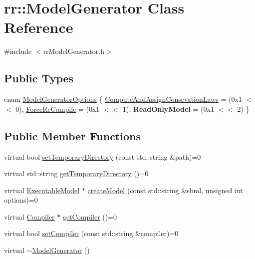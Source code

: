 \hypertarget{classrr_1_1_model_generator}{\section{rr\-:\-:Model\-Generator Class Reference}
\label{classrr_1_1_model_generator}
}


{\ttfamily \#include $<$rr\-Model\-Generator.\-h$>$}

\subsection*{Public Types}
\begin{DoxyCompactItemize}
\item 
enum \hyperlink{classrr_1_1_model_generator_a4f280529e0531ec3132c80ffda967767}{Model\-Generator\-Options} \{ \hyperlink{classrr_1_1_model_generator_a4f280529e0531ec3132c80ffda967767ae7234e27c5800a53fdafaba33a92e9d0}{Compute\-And\-Assign\-Consevation\-Laws} = (0x1 $<$$<$ 0), 
\hyperlink{classrr_1_1_model_generator_a4f280529e0531ec3132c80ffda967767a369f1d228bd06da224ce2235433af7eb}{Force\-Re\-Compile} = (0x1 $<$$<$ 1), 
{\bfseries Read\-Only\-Model} = (0x1 $<$$<$ 2)
 \}
\end{DoxyCompactItemize}
\subsection*{Public Member Functions}
\begin{DoxyCompactItemize}
\item 
virtual bool \hyperlink{classrr_1_1_model_generator_a8500374e3f19898dc3e62fbe864d785f}{set\-Temporary\-Directory} (const std\-::string \&path)=0
\item 
virtual std\-::string \hyperlink{classrr_1_1_model_generator_a89d7728fd2fa604a08e4733aeb09ce3c}{get\-Temporary\-Directory} ()=0
\item 
virtual \hyperlink{classrr_1_1_executable_model}{Executable\-Model} $\ast$ \hyperlink{classrr_1_1_model_generator_a7e30f93976e5f39ee274968690ca59b7}{create\-Model} (const std\-::string \&sbml, unsigned int options)=0
\item 
virtual \hyperlink{classrr_1_1_compiler}{Compiler} $\ast$ \hyperlink{classrr_1_1_model_generator_ab3dc4187297260b8ab1bcae15706153f}{get\-Compiler} ()=0
\item 
virtual bool \hyperlink{classrr_1_1_model_generator_a073e238ec9912aca3c4345967a651815}{set\-Compiler} (const std\-::string \&compiler)=0
\item 
virtual \hyperlink{classrr_1_1_model_generator_af73bfda91e966b534901a135815149e7}{$\sim$\-Model\-Generator} ()
\end{DoxyCompactItemize}


